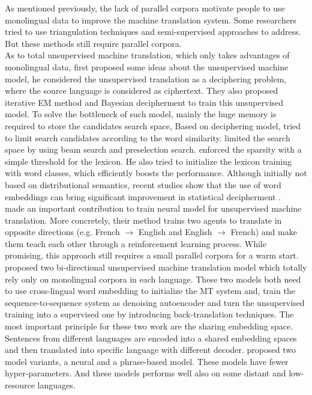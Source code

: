 As mentioned previously, the lack of parallel corpora motivate people to use monolingual data to improve the machine translation system. Some researchers tried to use triangulation techniques \cite{cohn2007machine} and semi-supervised approaches \cite{cheng2016semi}to address. But these methods still require parallel corpora.\\
As to total unsupervised machine translation, which only takes advantages of monolingual data,\cite{ravi2011deciphering} first proposed some ideas about the unsupervised machine model, he considered the unsupervised translation as a deciphering problem, where the source language is considered as ciphertext. They also proposed iterative EM method and Bayesian decipherment to train this unsupervised model. To solve the bottleneck of such model, mainly the huge memory is required to store the candidates search space, Based on deciphering model, \cite{nuhn2012deciphering} tried to limit search candidates according to the word similarity. \cite{nuhn2014decipherment} limited the search space by using beam search and preselection search. \cite{kim2017unsupervised} enforced the sparsity with a simple threshold for the lexicon. He also tried to initialize the lexicon training with word classes, which efficiently boosts the performance. 
Although initially not based on distributional semantics, recent studies show that the use of word embeddings can bring significant improvement in statistical decipherment \cite{duong2016learning}.\\
\cite{he2016dual} made an important contribution to train neural model for unsupervised machine translation. More concretely, their method trains two agents to translate in opposite directions (e.g. French ${\rightarrow}$ English and English ${\rightarrow}$ French) and make them teach each other through a reinforcement learning process. While promising, this approach still requires a small parallel corpora for a warm start.  
\cite{artetxe2017unsupervised} \cite{lample2017unsupervised} proposed two bi-directional unsupervised machine translation model which totally rely only on monolingual corpora in each language. These two models both need to use cross-lingual word embedding to initialize the MT system and, train the sequence-to-sequence system as denoising autoencoder and turn the unsupervised training into a supervised one by introducing back-translation techniques. The most important principle for these two work are the sharing embedding space. Sentences from different languages are encoded into a shared embedding spaces and then translated into specific language with different decoder.
\cite{lample2018phrase} proposed two model variants, a neural and a phrase-based model. These models have fewer hyper-parameters. And these models performs well also on some distant and low-resource languages.
